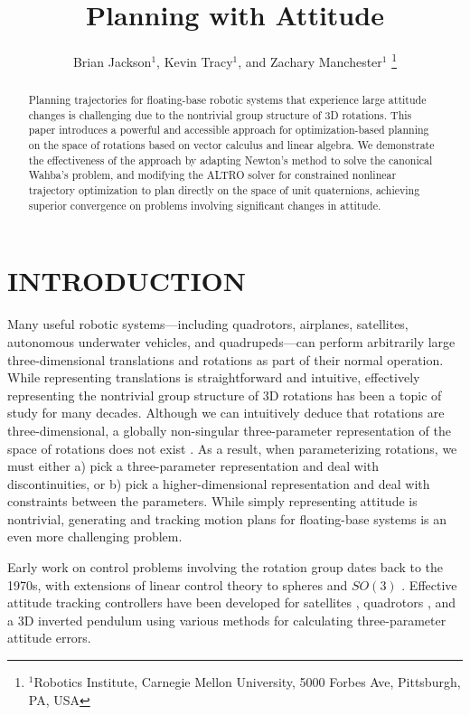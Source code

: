\documentclass[letterpaper, 10 pt, conference]{ieeeconf}  %
\title{\LARGE \bf
Planning with Attitude
}
\author{Brian Jackson$^1$, Kevin Tracy$^1$, and Zachary Manchester$^1$%
    \thanks{
        $^1$Robotics Institute, 
        Carnegie Mellon University, 
        5000 Forbes Ave, Pittsburgh, PA, USA
    }
}
\begin{document}
\maketitle

\begin{abstract}
Planning trajectories for floating-base robotic systems that experience
large attitude changes is challenging due to the nontrivial group structure of 3D
rotations. This paper introduces a powerful and accessible approach for 
optimization-based planning on the space of rotations based on vector calculus and
linear algebra. We demonstrate the effectiveness of the approach by adapting Newton's
method to solve the canonical Wahba's problem, and modifying the ALTRO solver for 
constrained nonlinear trajectory optimization to plan directly on the space of unit 
quaternions, achieving superior convergence on problems involving significant changes 
in attitude.
\end{abstract}

\section{INTRODUCTION}

    Many useful robotic systems---including quadrotors, airplanes, satellites, autonomous
    underwater vehicles, and quadrupeds---can perform arbitrarily large three-dimensional
    translations and rotations as part of their normal operation. While representing
    translations is straightforward and intuitive, effectively representing the
    nontrivial group structure of 3D rotations has been a topic of study for many
    decades. Although we can intuitively deduce that rotations are three-dimensional, a
    globally non-singular three-parameter representation of the space of rotations does
    not exist \cite{stuelpnagel1964parametrization}. As a result, when parameterizing
    rotations, we must either a) pick a three-parameter representation and deal with
    discontinuities, or b) pick a higher-dimensional representation and deal with
    constraints between the parameters. While simply representing attitude is nontrivial,
    generating and tracking motion plans for floating-base systems is an even more
    challenging problem.

    Early work on control problems involving the rotation group dates back to the 1970s,
    with extensions of linear control theory to spheres \cite{Brockett1973} and $SO(3)$
    \cite{Baillieul1978}. Effective attitude tracking controllers have been developed for
    satellites \cite{wie1985quaternion}, quadrotors
    \cite{Fresk2013,Liu2015,lee2010geometric,
    Johnson2005,watterson2020control,mellinger2011minimum}, and a 3D inverted pendulum
    \cite{Chaturvedi2009} using various methods for calculating three-parameter attitude
    errors.
\end{document}

